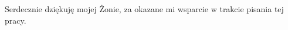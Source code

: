 \vspace*{\fill}
\begin{flushright}
Serdecznie dziękuję mojej Żonie, za okazane mi wsparcie w trakcie pisania tej pracy.
\end{flushright}